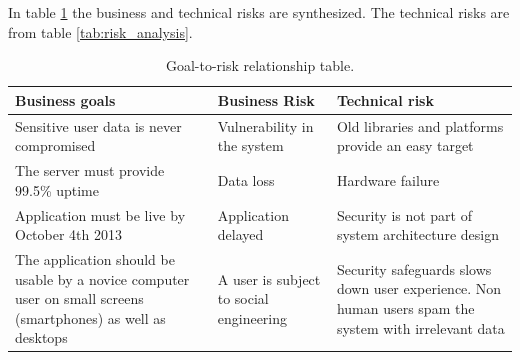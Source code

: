 \documentclass[a4paper]{article}
\begin{document}
In table \ref{tab:goal_to_risk_relationship} the business and technical risks are synthesized. The technical risks are from table \ref{tab:risk_analysis}.
\sffamily
\begin{table}[h!]
	\begin{tabular}{| p{4cm} | p{4cm}| p{4cm} |}
    \hline
   	\textbf{Business goals} & \textbf{Business Risk} & \textbf{Technical risk} \\ \hline
	Sensitive user data is never compromised & Vulnerability in the system & Old libraries and platforms provide an easy target \\ \hline
    The server must provide 99.5\% uptime & Data loss &  Hardware failure \\ \hline
    Application must be live by October 4th 2013 & Application delayed &  Security is not part of system architecture design \\ \hline
    The application should be usable by a novice computer user on small screens (smartphones) as well as desktops & A user is subject to social engineering & Security safeguards slows down user experience. Non human users spam the system with irrelevant data \\ \hline
    \end{tabular}
    \caption{Goal-to-risk relationship table.}
	\label{tab:goal_to_risk_relationship}
\end{table}

\rmfamily
\end{document}

